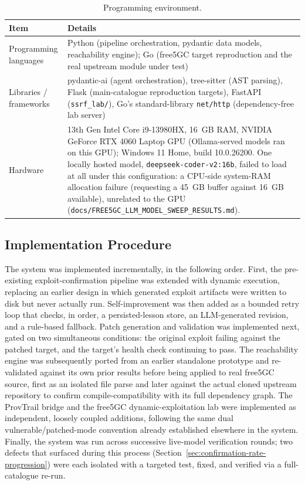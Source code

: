 \documentclass[12pt,a4paper]{report}
\begin{document}
\begin{table}[H]
\centering
\caption{Programming environment.}
\label{tab:prog-env}
\begin{tabular}{@{}p{4cm}p{9cm}@{}}
\toprule
\textbf{Item} & \textbf{Details} \\
\midrule
Programming languages & Python (pipeline orchestration, pydantic data models, reachability engine); Go (free5GC target reproduction and the real upstream module under test) \\
Libraries / frameworks & pydantic-ai (agent orchestration), tree-sitter (AST parsing), Flask (main-catalogue reproduction targets), FastAPI (\texttt{ssrf\_lab/}), Go's standard-library \texttt{net/http} (dependency-free lab server) \\
Hardware & 13th Gen Intel Core i9-13980HX, 16~GB RAM, NVIDIA GeForce RTX 4060 Laptop GPU (Ollama-served models ran on this GPU); Windows 11 Home, build 10.0.26200. One locally hosted model, \texttt{deepseek-coder-v2:16b}, failed to load at all under this configuration: a CPU-side system-RAM allocation failure (requesting a 45~GB buffer against 16~GB available), unrelated to the GPU (\texttt{docs/FREE5GC\_LLM\_MODEL\_SWEEP\_RESULTS.md}). \\
\bottomrule
\end{tabular}
\end{table}

\subsection{Implementation Procedure}
\label{sec:implementation-procedure}

The system was implemented incrementally, in the following order. First, the pre-existing exploit-confirmation pipeline was extended with dynamic execution, replacing an earlier design in which generated exploit artifacts were written to disk but never actually run. Self-improvement was then added as a bounded retry loop that checks, in order, a persisted-lesson store, an LLM-generated revision, and a rule-based fallback. Patch generation and validation was implemented next, gated on two simultaneous conditions: the original exploit failing against the patched target, and the target's health check continuing to pass. The reachability engine was subsequently ported from an earlier standalone prototype and re-validated against its own prior results before being applied to real free5GC source, first as an isolated file parse and later against the actual cloned upstream repository to confirm compile-compatibility with its full dependency graph. The ProvTrail bridge and the free5GC dynamic-exploitation lab were implemented as independent, loosely coupled additions, following the same dual vulnerable/patched-mode convention already established elsewhere in the system. Finally, the system was run across successive live-model verification rounds; two defects that surfaced during this process (Section~\ref{sec:confirmation-rate-progression}) were each isolated with a targeted test, fixed, and verified via a full-catalogue re-run.
\end{document}
